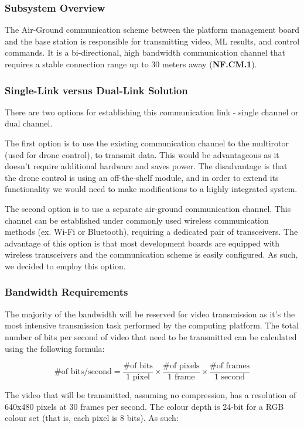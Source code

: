 \subsubsection{Subsystem Overview}
The Air-Ground communication scheme between the platform management board and the base station is responsible for transmitting video, ML results, and control commands. It is a bi-directional, high bandwidth communication channel that requires a stable connection range up to 30 meters away (\textbf{NF.CM.1}).

\subsubsection{Single-Link versus Dual-Link Solution}
There are two options for establishing this communication link - single channel or dual channel. 

The first option is to use the existing communication channel to the multirotor (used for drone control), to transmit data. This would be advantageous as it doesn't require additional hardware and saves power. The disadvantage is that the drone control is using an off-the-shelf module, and in order to extend its functionality we would need to make modifications to a highly integrated system. 

The second option is to use a separate air-ground communication channel. This channel can be established under commonly used wireless communication methods (ex. Wi-Fi or Bluetooth), requiring a dedicated pair of transceivers. The advantage of this option is that most development boards are equipped with wireless transceivers and the communication scheme is easily configured. As such, we decided to employ this option.

\subsubsection{Bandwidth Requirements}

The majority of the bandwidth will be reserved for video transmission as it's the most intensive transmission task performed by the computing platform. The total number of bits per second of video that need to be transmitted can be calculated using the following formula:

$$
\text{\# of bits/second} = \frac{\text{\# of bits}}{\text{1 pixel}} \times \frac{\text{\# of pixels}}{\text{1 frame}} \times \frac{\text{\# of frames}}{\text{1 second}}
$$

The video that will be transmitted, assuming no compression, has a resolution of 640x480 pixels at 30 frames per second. The colour depth is 24-bit for a RGB colour set (that is, each pixel is 8 bits). As such:

